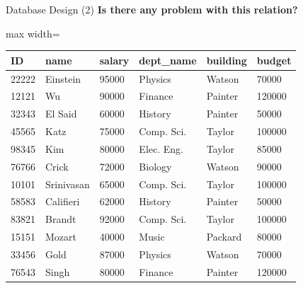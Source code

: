 \documentclass[aspectratio=169, xcolor=dvipsnames]{beamer}
\begin{document}
\begin{frame}{Database Design (2)}
    \textbf{Is there any problem with this relation?}
    \vspace{0.5em}
    \begin{center}
        \begin{adjustbox}{max width=\textwidth}
        \begin{tabular}{|l|l|l|l|l|l|}
        \hline
        \textbf{ID} & \textbf{name} & \textbf{salary} & \textbf{dept\_name} & \textbf{building} & \textbf{budget} \\ \hline
        22222 & Einstein & 95000 & Physics & Watson & 70000 \\ \hline
        12121 & Wu & 90000 & Finance & Painter & 120000 \\ \hline
        32343 & El Said & 60000 & History & Painter & 50000 \\ \hline
        45565 & Katz & 75000 & Comp. Sci. & Taylor & 100000 \\ \hline
        98345 & Kim & 80000 & Elec. Eng. & Taylor & 85000 \\ \hline
        76766 & Crick & 72000 & Biology & Watson & 90000 \\ \hline
        10101 & Srinivasan & 65000 & Comp. Sci. & Taylor & 100000 \\ \hline
        58583 & Califieri & 62000 & History & Painter & 50000 \\ \hline
        83821 & Brandt & 92000 & Comp. Sci. & Taylor & 100000 \\ \hline
        15151 & Mozart & 40000 & Music & Packard & 80000 \\ \hline
        33456 & Gold & 87000 & Physics & Watson & 70000 \\ \hline
        76543 & Singh & 80000 & Finance & Painter & 120000 \\ \hline
        \end{tabular}
        \end{adjustbox}
    \end{center}
\end{frame}
\end{document}
